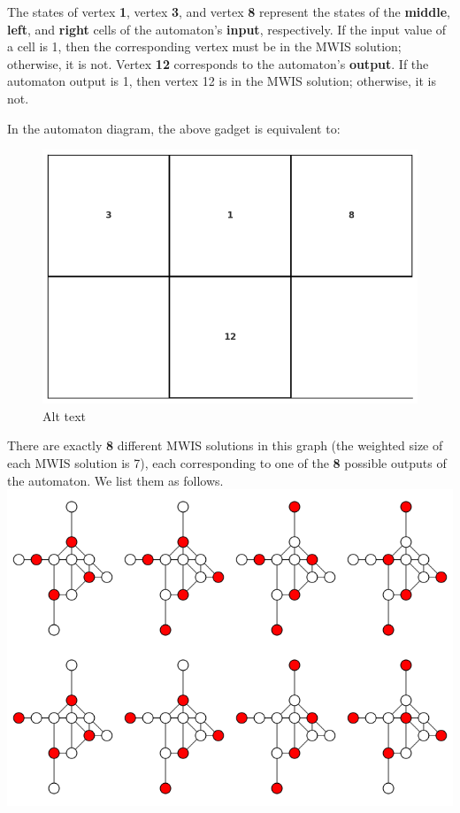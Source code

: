 \documentclass[twocolumn,superscriptaddress,english,showpacs,longbibliography]{revtex4-2}
\begin{document}
The states of vertex \textbf{1}, vertex \textbf{3}, and vertex
\textbf{8} represent the states of the \textbf{middle}, \textbf{left},
and \textbf{right} cells of the automaton's \textbf{input},
respectively. If the input value of a cell is 1, then the corresponding
vertex must be in the MWIS solution; otherwise, it is not. Vertex
\textbf{12} corresponds to the automaton's \textbf{output}. If the
automaton output is 1, then vertex 12 is in the MWIS solution;
otherwise, it is not.

In the automaton diagram, the above gadget is equivalent to:

\begin{figure}
\centering
\includegraphics[width=\columnwidth]{../notes/images/rule110.png}
\caption{Alt text}
\end{figure}

There are exactly \textbf{8} different MWIS solutions in this graph (the
weighted size of each MWIS solution is 7), each corresponding to one of
the \textbf{8} possible outputs of the automaton. We list them as
follows.
\includegraphics[width=\columnwidth]{../notes/images/gadget110.png}
\end{document}
